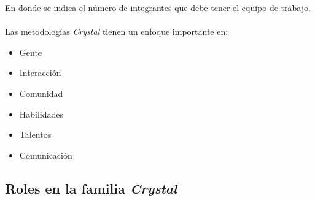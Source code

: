 \documentclass[12pt,a4paper]{article}
\begin{document}
	En donde se indica el n\'umero de integrantes que debe tener el equipo de trabajo.\\
\\
	Las metodolog\'ias {\itshape Crystal} tienen un enfoque importante en:
	\begin{itemize}
		\item Gente 
		\item Interacci\'on
		\item Comunidad
		\item Habilidades
		\item Talentos
		\item Comunicaci\'on
	\end{itemize}

\subsection*{Roles en la familia {\itshape Crystal}}
	
\end{document}
